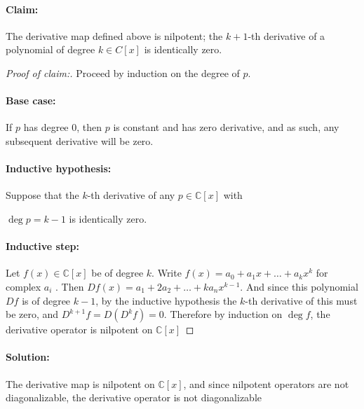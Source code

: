 \documentclass{article}
\begin{document}
\begin{enumerate}
    \paragraph{Claim: }The derivative map defined above is nilpotent; the $k+1$-th derivative of a polynomial of degree $k\in C[x]$ is identically zero. 
    \begin{proof} [Proof of claim:]
        
  Proceed by induction on the degree of $p$. 
  \paragraph{Base case:} If $p$ has degree $0$, then $p$ is constant and has zero derivative, and as such, any subsequent derivative will be zero.
  \paragraph{Inductive hypothesis:} Suppose that the $k$-th derivative of any  $p \in \mathbb{C}[x]$ with 

  $\deg p=k-1$ is identically zero.
  \paragraph{Inductive step:} Let $f(x)\in \mathbb{C}[x]$ be of degree $k$. Write $f(x)=a_0+a_1x+\ldots+a_kx^{k}$ for complex $a_i$ . Then $Df(x)=a_1+2a_2+\ldots+ka_nx^{k-1}$. And since this polynomial $Df$ is of degree $k-1$, by the inductive hypothesis the $k$-th derivative of this must be zero, and \newline $D^{k+1}f=D(D^{k}f)=0$. Therefore by induction on $\deg f$, the derivative operator is nilpotent on $\mathbb{C}[x]$
    \end{proof}
  \paragraph{Solution: } The derivative map is nilpotent on $\mathbb{C}[x]$, and since nilpotent operators are not diagonalizable, the derivative operator is not diagonalizable

\end{enumerate}
\end{document}
